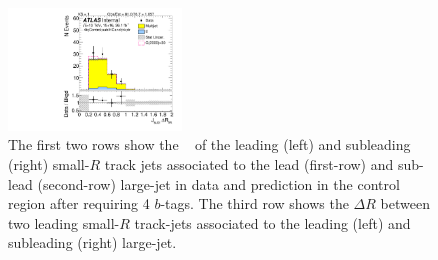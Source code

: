 \begin{figure}[htb!]
\begin{center}
\includegraphics[width=0.41\textwidth,angle=-90]{figures/boosted/Control/b77_FourTag_Control_sublHCand_trk_dr.pdf}
  \caption{The first two rows show the \pt~ of the leading (left) and subleading (right) small-$R$ track jets associated to the lead (first-row) and sub-lead (second-row) large-\R jet in data and prediction in the control region after requiring 4 $b$-tags. The third row shows the $\Delta R$ between two leading small-$R$ track-jets associated to the leading (left) and subleading (right) large-\R jet.  }
  \label{fig:boosted-4b-control-ak2}
\end{center}
\end{figure}


